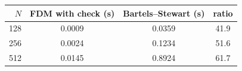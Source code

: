 \begin{tabular}{r ccc}
\toprule
$N$ & FDM with check (s) & Bartels--Stewart (s) & ratio\\
\midrule
128 & 0.0009 & 0.0359 & 41.9\\
256 & 0.0024 & 0.1234 & 51.6\\
512 & 0.0145 & 0.8924 & 61.7\\
\bottomrule
\end{tabular}

